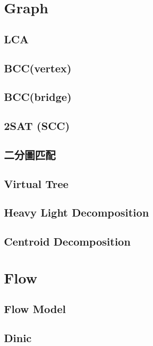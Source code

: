 \section{Graph}
\subsection{LCA}

\subsection{BCC(vertex)}

\subsection{BCC(bridge)}

\subsection{2SAT (SCC)}

\subsection{二分圖匹配}

\subsection{Virtual Tree}

\subsection{Heavy Light Decomposition}

\subsection{Centroid Decomposition}


\section{Flow}
\subsection{Flow Model}

\subsection{Dinic}


